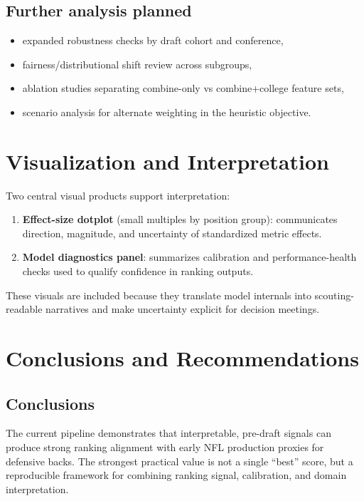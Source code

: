 \documentclass[10pt]{article}
\begin{document}
\subsection{Further analysis planned}
\begin{itemize}
  \item expanded robustness checks by draft cohort and conference,
  \item fairness/distributional shift review across subgroups,
  \item ablation studies separating combine-only vs combine+college feature sets,
  \item scenario analysis for alternate weighting in the heuristic objective.
\end{itemize}

\section{Visualization and Interpretation}
Two central visual products support interpretation:
\begin{enumerate}
  \item \textbf{Effect-size dotplot} (small multiples by position group): communicates direction, magnitude, and uncertainty of standardized metric effects.
  \item \textbf{Model diagnostics panel}: summarizes calibration and performance-health checks used to qualify confidence in ranking outputs.
\end{enumerate}

These visuals are included because they translate model internals into scouting-readable narratives and make uncertainty explicit for decision meetings.

\section{Conclusions and Recommendations}
\subsection{Conclusions}
The current pipeline demonstrates that interpretable, pre-draft signals can produce strong ranking alignment with early NFL production proxies for defensive backs. The strongest practical value is not a single ``best'' score, but a reproducible framework for combining ranking signal, calibration, and domain interpretation.
\end{document}
